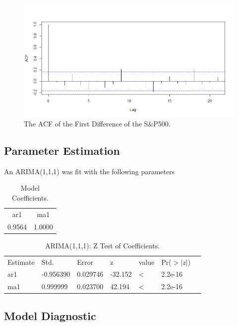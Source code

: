 \documentclass[12pt, centerh1]{article}
\begin{document}
\begin{figure}[H]
    \centering
    \includegraphics[scale=0.5]{imgs/acf_first.png}
    \caption{The ACF of the First Difference of the S\&P500.}
    \label{fig:acf_first}
\end{figure}

\subsection{Parameter Estimation} 

An ARIMA(1,1,1) was fit with the following parameters
\begin{table}[H]
\centering
\begin{tabular}{cc}
ar1     & ma1   \\
 0.9564  & 1.0000      
\end{tabular}
\caption{Model Coefficients.}
\label{table:coefficients}
\end{table}

\begin{table}[H]
\centering
\begin{tabular}{lllllll}
Estimate & Std.      & Error    & z       & value       & Pr($>|z|$) &     \\
ar1      & -0.956390 & 0.029746 & -32.152 & \textless{} & 2.2e-16 \\
ma1      & 0.999999  & 0.023700 & 42.194  & \textless{} & 2.2e-16
\end{tabular}
\caption{ARIMA(1,1,1): Z Test of Coefficients.}
\label{table:1}
\end{table}

\subsection{Model Diagnostic}
\end{document}
